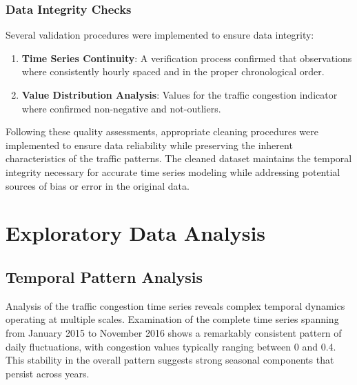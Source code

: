 \documentclass{article}
\begin{document}
\subsubsection{Data Integrity Checks}
Several validation procedures were implemented to ensure data integrity:

\begin{enumerate}
    \item \textbf{Time Series Continuity}: A verification process confirmed that observations where consistently hourly spaced and in the proper chronological order.
    
    \item \textbf{Value Distribution Analysis}: Values for the traffic congestion indicator where confirmed non-negative and not-outliers.
\end{enumerate}

Following these quality assessments, appropriate cleaning procedures were implemented to ensure data reliability while preserving the inherent characteristics of the traffic patterns. The cleaned dataset maintains the temporal integrity necessary for accurate time series modeling while addressing potential sources of bias or error in the original data.

\section{Exploratory Data Analysis}

\subsection{Temporal Pattern Analysis}
Analysis of the traffic congestion time series reveals complex temporal dynamics operating at multiple scales. Examination of the complete time series spanning from January 2015 to November 2016 shows a remarkably consistent pattern of daily fluctuations, with congestion values typically ranging between 0 and 0.4. This stability in the overall pattern suggests strong seasonal components that persist across years.
\end{document}
